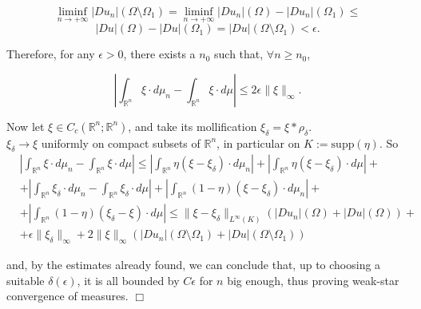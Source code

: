 \[ \liminf \limits_{n \to +\infty} |Du_{n}|(\Omega \setminus \Omega_{1}) = \liminf \limits_{n \to +\infty} |Du_{n}|(\Omega) - |Du_{n}|(\Omega_{1}) \le \]
\[ |Du|(\Omega) - |Du|(\Omega_{1}) = |Du|(\Omega \setminus \Omega_{1}) < \epsilon. \]

Therefore, for any $\epsilon > 0$, there exists a $n_{0}$ such that, $\forall n \ge n_{0}$,

\[ \left | \int_{\mathbb{R}^{n}} \xi \cdot d \mu_{n} - \int_{\mathbb{R}^{n}} \xi \cdot d \mu \right | \le 2 \epsilon \|\xi\|_{\infty}. \]

Now let $\xi \in C_{c}( \mathbb{R}^{n}; \mathbb{R}^{n})$, and take its mollification $\xi_{\delta} = \xi \ast \rho_{\delta}$. 
\\
$\xi_{\delta} \to \xi$ uniformly on compact subsets of $\mathbb{R}^{n}$, in particular on $K := \mathrm{supp}(\eta)$. So
\begin{align*} & \left | \int_{\mathbb{R}^{n}} \xi \cdot d \mu_{n} - \int_{\mathbb{R}^{n}} \xi \cdot d \mu \right | \le \left | \int_{\mathbb{R}^{n}} \eta (\xi - \xi_{\delta}) \cdot d \mu_{n} \right | + \left | \int_{\mathbb{R}^{n}} \eta (\xi -\xi_{\delta}) \cdot d \mu \right | + \\
& + \left | \int_{\mathbb{R}^{n}} \xi_{\delta} \cdot d \mu_{n} - \int_{\mathbb{R}^{n}} \xi_{\delta} \cdot d \mu \right | + \left | \int_{\mathbb{R}^{n}} (1 - \eta) (\xi - \xi_{\delta}) \cdot d \mu_{n} \right | + \\
& + \left | \int_{\mathbb{R}^{n}} (1 - \eta) (\xi_{\delta} - \xi) \cdot d \mu \right | \le \|\xi - \xi_{\delta}\|_{L^{\infty}(K)} (|Du_{n}|(\Omega) + |Du|(\Omega)) + \\
& + \epsilon \|\xi_{\delta}\|_{\infty} + 2\|\xi\|_{\infty}(|Du_{n}|(\Omega \setminus \Omega_{1}) + |Du|(\Omega \setminus \Omega_{1}) ) \end{align*}

and, by the estimates already found, we can conclude that, up to choosing a suitable $\delta(\epsilon)$, it is all bounded by $C \epsilon$ for $n$ big enough, thus proving weak-star convergence of measures. $\Box$






















